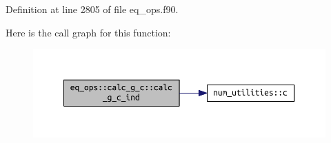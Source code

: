Definition at line 2805 of file eq\+\_\+ops.\+f90.

Here is the call graph for this function\+:\nopagebreak
\begin{figure}[H]
\begin{center}
\leavevmode
\includegraphics[width=350pt]{interfaceeq__ops_1_1calc__g__c_a55dca52f3f82960703162dba425d358d_cgraph}
\end{center}
\end{figure}


